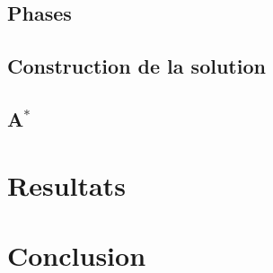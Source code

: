 \documentclass[tikz]{beamer}
\begin{document}
\subsection{Phases}
\subsection{Construction de la solution}
\subsection{A\(^*\)}

\section{Resultats}

\section*{Conclusion}
\end{document}
